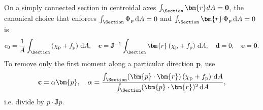 On a simply connected section in centroidal axes $\int_{\Section} \bm{r} d A=\mathbf{0}$, the canonical choice that enforces
$\int_{\Section} \Phi_{\mathrm{p}}\, \mathrm{d} A=0$ and $\int_{\Section} \bm{r}\, \Phi_{\mathrm{p}}\, \mathrm{d} A=0$ is
$$
c_0=\frac{1}{A} \int_{\Section}\left(\chi_{\mathrm{p}}+f_{\mathrm{p}}\right) \, \mathrm{d} A, 
\quad 
\mathbf{c}=\mathbf{J}^{-1} \int_{\Section} \bm{r}\left(\chi_{\mathrm{p}}+f_{\mathrm{p}}\right) \,\mathrm{d} A, 
\quad \mathbf{d}=0, 
\quad \mathbf{e}=\mathbf{0} .
$$
To remove only the first moment along a particular direction \(\bm{p}\), use
$$
\mathbf{c}=\alpha \bm{p}, 
\quad \alpha=\frac{\int_{\Section}(\bm{p} \cdot \bm{r})\left(\chi_{\mathrm{p}}+f_{\mathrm{p}}\right) \,\mathrm{d} A}{\int_{\Section}(\bm{p} \cdot \bm{r})^2 \,\mathrm{d} A},
$$
i.e. divide by \(p\cdot \mathbf{J} p\).
\fi 

